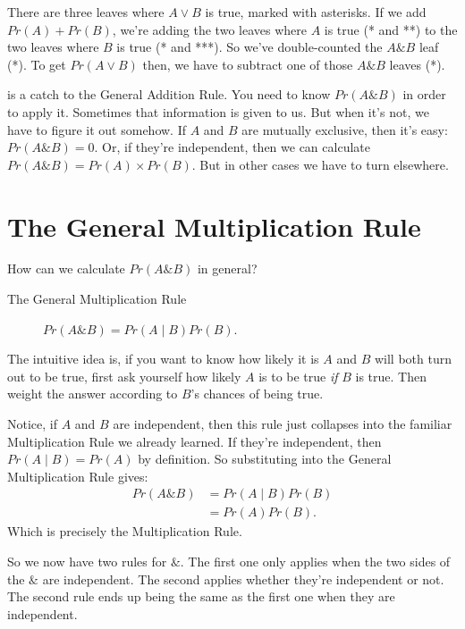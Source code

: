 \documentclass[justified]{tufte-book}
\newcommand{\given}{\mid}
\renewcommand{\wedge}{\mathbin{\&}}
\newcommand{\p}{Pr}
\theoremstyle{definition}
\theoremstyle{definition}
\theoremstyle{definition}
\theoremstyle{definition}
\theoremstyle{remark}
\begin{document}
There are three leaves where \(A \vee B\) is true, marked with asterisks. If we add \(\p(A) + \p(B)\), we're adding the two leaves where \(A\) is true (* and **) to the two leaves where \(B\) is true (* and ***). So we've double-counted the \(A \wedge B\) leaf (*). To get \(\p(A \vee B)\) then, we have to subtract one of those \(A \wedge B\) leaves (*).

 is a catch to the General Addition Rule. You need to know \(\p(A \wedge B)\) in order to apply it. Sometimes that information is given to us. But when it's not, we have to figure it out somehow. If \(A\) and \(B\) are mutually exclusive, then it's easy: \(\p(A \wedge B) = 0\). Or, if they're independent, then we can calculate \(\p(A \wedge B) = \p(A) \times \p(B)\). But in other cases we have to turn elsewhere.

\hypertarget{the-general-multiplication-rule}{%
\section{The General Multiplication Rule}\label{the-general-multiplication-rule}}

How can we calculate \(\p(A \wedge B)\) in general?

\begin{description}
\item[The General Multiplication Rule]
\(\p(A \wedge B) = \p(A \given B) \p(B).\)
\end{description}

The intuitive idea is, if you want to know how likely it is \(A\) and \(B\) will both turn out to be true, first ask yourself how likely \(A\) is to be true \emph{if} \(B\) is true. Then weight the answer according to \(B\)'s chances of being true.

Notice, if \(A\) and \(B\) are independent, then this rule just collapses into the familiar Multiplication Rule we already learned. If they're independent, then \(\p(A \given B) = \p(A)\) by definition. So substituting into the General Multiplication Rule gives:
\[
  \begin{aligned}
    \p(A \wedge B) &= \p(A \given B) \p(B)\\
                   &= \p(A) \p(B).
  \end{aligned}
\]
Which is precisely the Multiplication Rule.

So we now have two rules for \(\wedge\). The first one only applies when the two sides of the \(\wedge\) are independent. The second applies whether they're independent or not. The second rule ends up being the same as the first one when they are independent.
\end{document}
